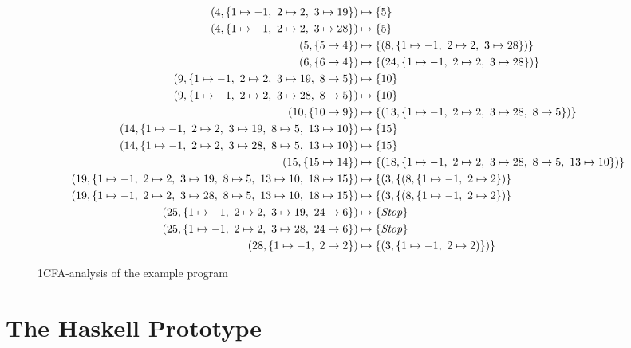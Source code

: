 \documentclass[a4paper,parskip=half,BCOR=8mm,DIV=calc,12pt]{scrbook}
\begin{document}
\begin{sidewaysfigure}
\begin{framed}
\vspace{-1em}
\small
\begin{align*}
(4,\{1\mapsto -1,\ 2\mapsto 2,\ 3\mapsto 19\}) &\mapsto \{5\}\\
(4,\{1\mapsto -1,\ 2\mapsto 2,\ 3\mapsto 28\}) &\mapsto \{5\}\\
(5,\{5\mapsto 4\}) &\mapsto \{(8,\{1 \mapsto -1,\ 2\mapsto 2,\ 3 \mapsto 28\})\}\\
(6,\{6\mapsto 4\}) &\mapsto \{(24,\{1 \mapsto -1,\ 2\mapsto 2,\ 3 \mapsto 28\})\}\\
(9,\{1\mapsto -1,\ 2\mapsto 2,\ 3\mapsto 19,\ 8\mapsto 5\}) &\mapsto \{10\}\\
(9,\{1\mapsto -1,\ 2\mapsto 2,\ 3\mapsto 28,\ 8\mapsto 5\}) &\mapsto \{10\}\\
(10,\{10\mapsto 9\}) &\mapsto \{(13, \{1 \mapsto -1,\ 2\mapsto 2,\ 3 \mapsto 28,\ 8\mapsto 5\})\}\\
(14,\{1\mapsto -1,\ 2\mapsto 2,\ 3\mapsto 19,\ 8\mapsto 5,\ 13\mapsto 10\}) &\mapsto \{15\}\\
(14,\{1\mapsto -1,\ 2\mapsto 2,\ 3\mapsto 28,\ 8\mapsto 5,\ 13\mapsto 10\}) &\mapsto \{15\}\\
(15,\{15\mapsto 14\}) &\mapsto \{(18,\{1\mapsto -1,\ 2\mapsto 2,\ 3\mapsto 28,\ 8\mapsto 5,\ 13\mapsto 10\})\}\\
(19,\{1\mapsto -1,\ 2\mapsto 2,\ 3\mapsto 19,\ 8\mapsto 5,\ 13\mapsto 10,\ 18\mapsto 15\}) &\mapsto \{(3, \{(8,\{1 \mapsto -1,\ 2\mapsto 2\})\}\\
(19,\{1\mapsto -1,\ 2\mapsto 2,\ 3\mapsto 28,\ 8\mapsto 5,\ 13\mapsto 10,\ 18\mapsto 15\}) &\mapsto \{(3, \{(8,\{1 \mapsto -1,\ 2\mapsto 2\})\}\\
(25,\{1\mapsto -1,\ 2\mapsto 2,\ 3\mapsto 19,\ 24\mapsto 6\}) &\mapsto \{\text{\textit{Stop}}\}\\
(25,\{1\mapsto -1,\ 2\mapsto 2,\ 3\mapsto 28,\ 24\mapsto 6\}) &\mapsto \{\text{\textit{Stop}}\}\\
(28,\{1\mapsto -1,\ 2\mapsto 2\}) &\mapsto \{(3,\{1 \mapsto -1,\ 2\mapsto 2)\})\}
\end{align*}
\end{framed}
\caption{1CFA-analysis of the example program}
\label{fig:examplecfa1}
\end{sidewaysfigure}


\chapter{The Haskell Prototype}
\label{chaphaskell}
\end{document}

